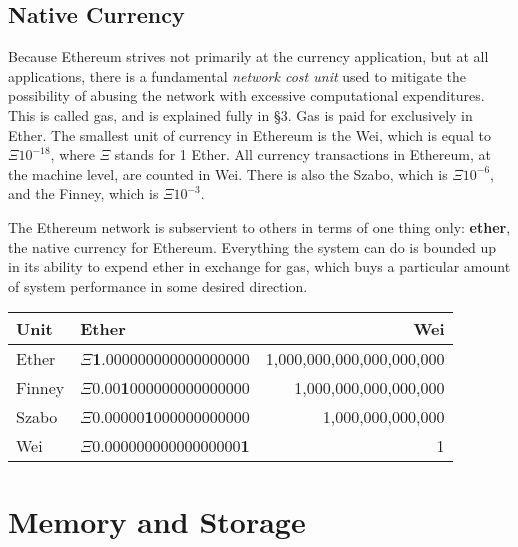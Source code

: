 \documentclass[10pt,a4paper,leqno,bibliography=totoc]{scrartcl}
\newenvironment{alphafootnotes}
{\par\edef\savedfootnotenumber{\number\value{footnote}}
\renewcommand{\thefootnote}{\alph{footnote}}
\setcounter{footnote}{0}}
{\par\setcounter{footnote}{\savedfootnotenumber}}
\begin{document}
\begin{alphafootnotes}
\begin{multicols*}{2}
\begin{justify}
	 	\subsection{Native Currency}
		Because Ethereum strives not primarily at the currency application, but at all applications, there is a fundamental \textsl{network cost unit} used to mitigate the possibility of abusing the network with excessive computational expenditures. This is called gas, and is explained fully in \S3. Gas is paid for exclusively in Ether. The smallest unit of currency in Ethereum is the Wei, which is equal to $\Xi10^{-18}$, where $\Xi$ stands for 1 Ether. All currency transactions in Ethereum, at the machine level, are counted in Wei. There is also the Szabo, which is $\Xi10^{-6}$,  and the Finney, which is $\Xi10^{-3}$.
		
		The Ethereum network is subservient to others in terms of one thing only: \textbf{ether}, the native currency for Ethereum. Everything the system can do is bounded up in its ability to expend ether in exchange for gas, which buys a particular amount of system performance in some desired direction. 
		
	\end{justify}
\raggedright
		\begin{tabular}{llr}
			\toprule
			\textbf{Unit} & \textbf{Ether} & \textbf{Wei} \\
			\midrule
			\scriptsize{Ether} & \scriptsize{$\Xi$\textbf{1}.000000000000000000} & \scriptsize{1,000,000,000,000,000,000} \\
			\scriptsize{Finney} & \scriptsize{$\Xi$0.00\textbf{1}000000000000000} & \scriptsize{1,000,000,000,000,000} \\
			\scriptsize{Szabo} & \scriptsize{$\Xi$0.00000\textbf{1}000000000000} & \scriptsize{1,000,000,000,000} \\
			\scriptsize{Wei} & \scriptsize{$\Xi$0.00000000000000000\textbf{1}} & \scriptsize{1} \\
			\bottomrule
		\end{tabular}
\justify
		\section{Memory and Storage}
				
				

\end{multicols*}
\end{alphafootnotes}
\end{document}
